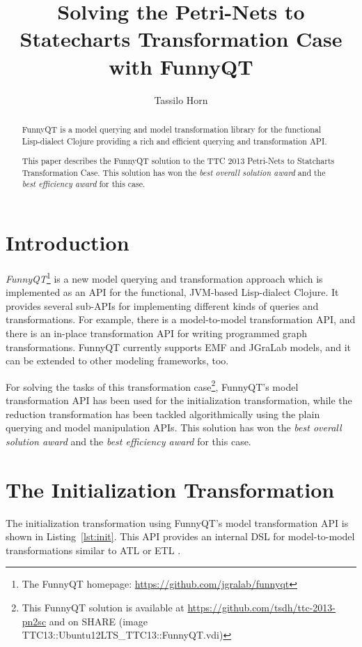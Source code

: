 \documentclass[submission]{eptcs}
\title{Solving the Petri-Nets to Statecharts Transformation Case with FunnyQT}
\author{Tassilo Horn
  \email{horn@uni-koblenz.de}
  \institute{Institute for Software Technology, University Koblenz-Landau, Germany}}
\begin{document}
\maketitle

\begin{abstract}
  FunnyQT is a model querying and model transformation library for the
  functional Lisp-dialect Clojure providing a rich and efficient querying and
  transformation API.

  This paper describes the FunnyQT solution to the TTC 2013 Petri-Nets to
  Statcharts Transformation Case.  This solution has won the \emph{best overall
    solution award} and the \emph{best efficiency award} for this case.
\end{abstract}

\section{Introduction}
\label{sec:introduction}

\emph{FunnyQT}\footnote{The FunnyQT homepage:
  \url{https://github.com/jgralab/funnyqt}} is a new model querying and
transformation approach which is implemented as an API for the functional,
JVM-based Lisp-dialect Clojure.  It provides several sub-APIs for implementing
different kinds of queries and transformations.  For example, there is a
model-to-model transformation API, and there is an in-place transformation API
for writing programmed graph transformations.  FunnyQT currently supports EMF
and JGraLab models, and it can be extended to other modeling frameworks, too.

For solving the tasks of this transformation case\footnote{This FunnyQT
  solution is available at \url{https://github.com/tsdh/ttc-2013-pn2sc} and on
  SHARE (image
  \textsf{TTC13::Ubuntu12LTS\_TTC13::FunnyQT.vdi})\label{fn:github}}, FunnyQT's
model transformation API has been used for the initialization transformation,
while the reduction transformation has been tackled algorithmically using the
plain querying and model manipulation APIs.  This solution has won the
\emph{best overall solution award} and the \emph{best efficiency award} for
this case.

\section{The Initialization Transformation}
\label{sec:init-transformation}

The initialization transformation using FunnyQT's model transformation API is
shown in Listing~\ref{lst:init}.  This API provides an internal DSL
\cite{book:Fowler2010DSL} for model-to-model transformations similar to ATL
\cite{ATL05} or ETL \cite{booklet:epsilon}.
\end{document}
